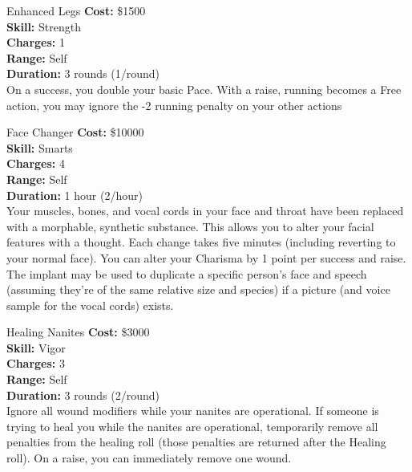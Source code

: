 \begin{multicols}{2}
\begin{genericsection}{Enhanced Legs}
\textbf{Cost:} \$1500\\
\textbf{Skill:} Strength\\
\textbf{Charges:} 1\\
\textbf{Range:} Self\\
\textbf{Duration:} 3 rounds (1/round)\\
On a success, you double your basic Pace. With a raise, running becomes a Free action, you may ignore the -2 running penalty on your other actions
\end{genericsection}

\begin{genericsection}{Face Changer}
\textbf{Cost:} \$10000\\
\textbf{Skill:} Smarts\\
\textbf{Charges:} 4\\
\textbf{Range:} Self\\
\textbf{Duration:} 1 hour (2/hour)\\
Your muscles, bones, and vocal cords in your face and throat have been replaced with a morphable, synthetic substance. This allows you to alter your facial features with a thought. Each change takes five minutes (including reverting to your normal face). You can alter your Charisma by 1 point per success and raise. The implant may be used to duplicate a specific person’s face and speech (assuming they’re of the same relative size and species) if a picture (and voice sample for the vocal cords) exists.
\end{genericsection}

\begin{genericsection}{Healing Nanites}
\textbf{Cost:} \$3000\\
\textbf{Skill:} Vigor\\
\textbf{Charges:} 3\\
\textbf{Range:} Self\\
\textbf{Duration:} 3 rounds (2/round)\\
Ignore all wound modifiers while your nanites are operational. If someone is trying to heal you while the nanites are operational, temporarily remove all penalties from the healing roll (those penalties are returned after the Healing roll). On a raise, you can immediately remove one wound.
\end{genericsection}


\end{multicols}
